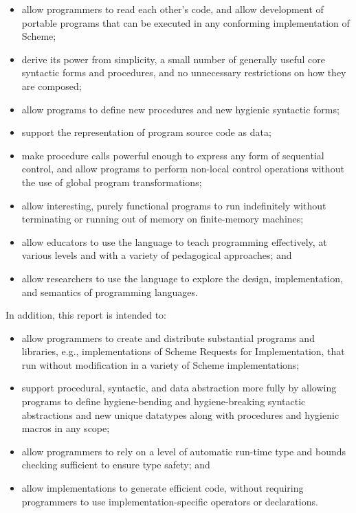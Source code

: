 \begin{itemize}
\item allow programmers to read each other's code, and allow
  development of portable programs that can be executed in any
  conforming implementation of Scheme;

\item derive its power from simplicity, a small number of generally
  useful core syntactic forms and procedures, and no unnecessary
  restrictions on how they are composed;
  
\item allow programs to define new procedures and new hygienic
  syntactic forms;
  
\item support the representation of program source code as data;
  
\item make procedure calls powerful enough to express any form of
  sequential control, and allow programs to perform non-local control
  operations without the use of global program transformations;
  
\item allow interesting, purely functional programs to run indefinitely
  without terminating or running out of memory on finite-memory
  machines;
  
\item allow educators to use the language to teach programming
  effectively, at various levels and with a variety of pedagogical
  approaches; and

\item allow researchers to use the language to explore the design,
  implementation, and semantics of programming languages.
\end{itemize}

In addition, this report is intended to:

\begin{itemize}
\item allow programmers to create and distribute substantial programs
  and libraries, e.g., implementations of Scheme Requests for
  Implementation, that run without
  modification in a variety of Scheme implementations;
  
\item support procedural, syntactic, and data abstraction more fully
  by allowing programs to define hygiene-bending and hygiene-breaking
  syntactic abstractions and new unique datatypes along with
  procedures and hygienic macros in any scope;
  
\item allow programmers to rely on a level of automatic run-time type
  and bounds checking sufficient to ensure type safety; and

\item allow implementations to generate efficient code, without
  requiring programmers to use implementation-specific operators or
  declarations.
\end{itemize}

